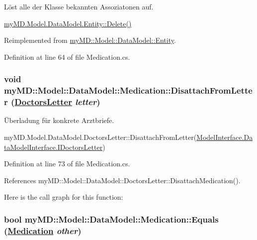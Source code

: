 L\"{o}st alle der Klasse bekannten Assoziatonen auf. 

\hyperlink{classmy_m_d_1_1_model_1_1_data_model_1_1_entity_51a833214dab53bfafb630573fc0fe77}{my\-MD.Model.Data\-Model.Entity::Delete()} 

Reimplemented from \hyperlink{classmy_m_d_1_1_model_1_1_data_model_1_1_entity_51a833214dab53bfafb630573fc0fe77}{my\-MD::Model::Data\-Model::Entity}.

Definition at line 64 of file Medication.cs.\hypertarget{classmy_m_d_1_1_model_1_1_data_model_1_1_medication_bb5c98e4dca1fcd06f87205e264503fc}{
\subsubsection[DisattachFromLetter]{\setlength{\rightskip}{0pt plus 5cm}void my\-MD::Model::Data\-Model::Medication::Disattach\-From\-Letter (\hyperlink{classmy_m_d_1_1_model_1_1_data_model_1_1_doctors_letter}{Doctors\-Letter} {\em letter})}}
\label{d0/daf/classmy_m_d_1_1_model_1_1_data_model_1_1_medication_bb5c98e4dca1fcd06f87205e264503fc}


\"{U}berladung f\"{u}r konkrete Arztbriefe. 

my\-MD.Model.Data\-Model.Doctors\-Letter::Disattach\-From\-Letter(\hyperlink{interfacemy_m_d_1_1_model_interface_1_1_data_model_interface_1_1_i_doctors_letter}{Model\-Interface.Data\-Model\-Interface.IDoctors\-Letter}) 

Definition at line 73 of file Medication.cs.

References my\-MD::Model::Data\-Model::Doctors\-Letter::Disattach\-Medication().

Here is the call graph for this function:\hypertarget{classmy_m_d_1_1_model_1_1_data_model_1_1_medication_9382c5f1e8e2c50f096f26ce77672d81}{
\subsubsection[Equals]{\setlength{\rightskip}{0pt plus 5cm}bool my\-MD::Model::Data\-Model::Medication::Equals (\hyperlink{classmy_m_d_1_1_model_1_1_data_model_1_1_medication}{Medication} {\em other})}}
\label{d0/daf/classmy_m_d_1_1_model_1_1_data_model_1_1_medication_9382c5f1e8e2c50f096f26ce77672d81}


